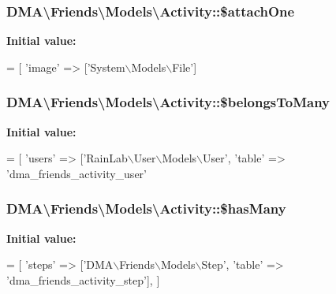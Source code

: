 \subsubsection[{\$attach\+One}]{\setlength{\rightskip}{0pt plus 5cm}D\+M\+A\textbackslash{}\+Friends\textbackslash{}\+Models\textbackslash{}\+Activity\+::\$attach\+One}\label{classDMA_1_1Friends_1_1Models_1_1Activity_a9911cb733cbc863cc1bdccde254404b5}
{\bfseries Initial value\+:}
\begin{DoxyCode}
= [
        \textcolor{stringliteral}{'image'} => [\textcolor{stringliteral}{'System\(\backslash\)Models\(\backslash\)File'}]
\end{DoxyCode}
\hypertarget{classDMA_1_1Friends_1_1Models_1_1Activity_ae5245e6eb74228cd54d8ae77e5a9bb38}{}
\subsubsection[{\$belongs\+To\+Many}]{\setlength{\rightskip}{0pt plus 5cm}D\+M\+A\textbackslash{}\+Friends\textbackslash{}\+Models\textbackslash{}\+Activity\+::\$belongs\+To\+Many}\label{classDMA_1_1Friends_1_1Models_1_1Activity_ae5245e6eb74228cd54d8ae77e5a9bb38}
{\bfseries Initial value\+:}
\begin{DoxyCode}
= [
        \textcolor{stringliteral}{'users'} => [\textcolor{stringliteral}{'RainLab\(\backslash\)User\(\backslash\)Models\(\backslash\)User'}, \textcolor{stringliteral}{'table'} => \textcolor{stringliteral}{'dma\_friends\_activity\_user'}
\end{DoxyCode}
\hypertarget{classDMA_1_1Friends_1_1Models_1_1Activity_a8b255e9889df95f8c702b72ed49ace25}{}
\subsubsection[{\$has\+Many}]{\setlength{\rightskip}{0pt plus 5cm}D\+M\+A\textbackslash{}\+Friends\textbackslash{}\+Models\textbackslash{}\+Activity\+::\$has\+Many}\label{classDMA_1_1Friends_1_1Models_1_1Activity_a8b255e9889df95f8c702b72ed49ace25}
{\bfseries Initial value\+:}
\begin{DoxyCode}
= [
        \textcolor{stringliteral}{'steps'} => [\textcolor{stringliteral}{'DMA\(\backslash\)Friends\(\backslash\)Models\(\backslash\)Step'}, \textcolor{stringliteral}{'table'} => \textcolor{stringliteral}{'dma\_friends\_activity\_step'}],
    ]
\end{DoxyCode}
\hypertarget{classDMA_1_1Friends_1_1Models_1_1Activity_a192fdaacf609961b7a436d2b967dfd60}{}
